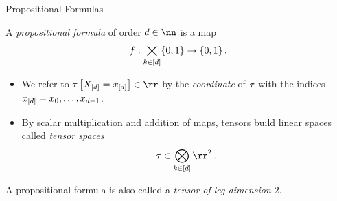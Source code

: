 \documentclass{beamer}
\begin{document}
    \begin{frame}{Propositional Formulas}
        \begin{definition}
            A \emph{propositional formula} of order $\atomorder\in\nn$ is a map
            \begin{align*}
                f : \bigtimes_{k\in[d]} \{0,1\} \rightarrow \{0,1\} \, .
            \end{align*}
            \begin{itemize}
                \item We refer to $\hypercoreat{\indexedshortcatvariables}\in\rr$ by the \emph{coordinate} of $\tau$ with the indices $x_{[d]}=x_{0},\ldots,x_{d-1}$.
                \item By scalar multiplication and addition of maps, tensors build linear spaces called \emph{tensor spaces}
                \[ \hypercore \in \bigotimes_{\catenumeratorin} \rr^2 \, . \]
            \end{itemize}
        \end{definition}

        A propositional formula is also called a \emph{tensor of leg dimension $2$}.


    \end{frame}


%
%            
%
%
%            
\end{document}

